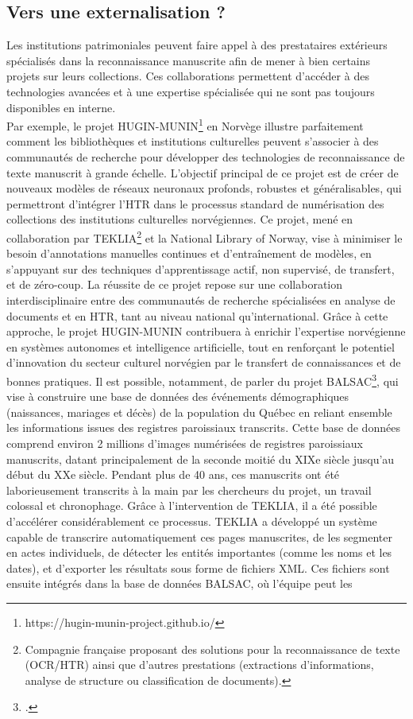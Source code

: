 \documentclass[a4paper,12pt,twoside]{book}
\begin{document}
	\subsection{Vers une externalisation ? }
	
	Les institutions patrimoniales peuvent faire appel à des prestataires extérieurs spécialisés dans la reconnaissance manuscrite afin de mener à bien certains projets sur leurs collections. Ces collaborations permettent d’accéder à des technologies avancées et à une expertise spécialisée qui ne sont pas toujours disponibles en interne.
	\\
	
	Par exemple, le projet HUGIN-MUNIN\footnote{ https://hugin-munin-project.github.io/} en Norvège illustre parfaitement comment les bibliothèques et institutions culturelles peuvent s’associer à des communautés de recherche pour développer des technologies de reconnaissance de texte manuscrit à grande échelle. L’objectif principal de ce projet est de créer de nouveaux modèles de réseaux neuronaux profonds, robustes et généralisables, qui permettront d’intégrer l’HTR dans le processus standard de numérisation des collections des institutions culturelles norvégiennes. Ce projet, mené en collaboration par TEKLIA\footnote{ Compagnie française proposant des solutions pour la reconnaissance de texte (OCR/HTR) ainsi que d’autres prestations (extractions d’informations, analyse de structure ou classification de documents).} et la National Library of Norway, vise à minimiser le besoin d’annotations manuelles continues et d’entraînement de modèles, en s’appuyant sur des techniques d’apprentissage actif, non supervisé, de transfert, et de zéro-coup. La réussite de ce projet repose sur une collaboration interdisciplinaire entre des communautés de recherche spécialisées en analyse de documents et en HTR, tant au niveau national qu’international. Grâce à cette approche, le projet HUGIN-MUNIN contribuera à enrichir l’expertise norvégienne en systèmes autonomes et intelligence artificielle, tout en renforçant le potentiel d’innovation du secteur culturel norvégien par le transfert de connaissances et de bonnes pratiques. Il est possible, notamment, de parler du projet BALSAC\footcite{vezina_overview_2020}, qui vise à construire une base de données des événements démographiques (naissances, mariages et décès) de la population du Québec en reliant ensemble les informations issues des registres paroissiaux transcrits. Cette base de données comprend environ 2 millions d’images numérisées de registres paroissiaux manuscrits, datant principalement de la seconde moitié du XIXe siècle jusqu’au début du XXe siècle. Pendant plus de 40 ans, ces manuscrits ont été laborieusement transcrits à la main par les chercheurs du projet, un travail colossal et chronophage. Grâce à l’intervention de TEKLIA, il a été possible d’accélérer considérablement ce processus. TEKLIA a développé un système capable de transcrire automatiquement ces pages manuscrites, de les segmenter en actes individuels, de détecter les entités importantes (comme les noms et les dates), et d’exporter les résultats sous forme de fichiers XML. Ces fichiers sont ensuite intégrés dans la base de données BALSAC, où l’équipe peut les 
\end{document}
